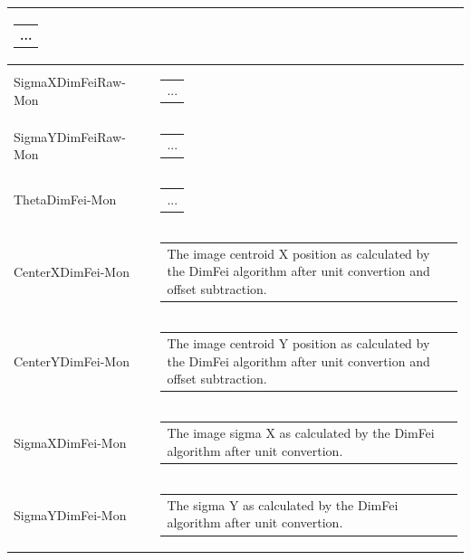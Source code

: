 \documentclass[openany]{article}
\begin{document}
\begin{longtable}{| m{3.0cm} m{4.5cm} m{7.0cm} |}
\begin{tabular}{@{}m{6cm}@{}}
                ...
            \end{tabular} \hypertarget{pv:sigma-x-dimfei-raw}{}\\ \hline
        SigmaXDimFeiRaw-Mon &  & \begin{tabular}{@{}m{6cm}@{}}
                ...
            \end{tabular} \hypertarget{pv:center-y-dimfei-raw}{}\\ \hline
        SigmaYDimFeiRaw-Mon &  & \begin{tabular}{@{}m{6cm}@{}}
                ...
            \end{tabular} \hypertarget{pv:theta-dimfei}{}\\ \hline
        ThetaDimFei-Mon &  & \begin{tabular}{@{}m{6cm}@{}}
                ...
            \end{tabular} \hypertarget{pv:center-x-dimfei}{}\\ \hline
        CenterXDimFei-Mon &  & \begin{tabular}{@{}m{6cm}@{}}
                The image centroid X position as calculated by the DimFei algorithm
                after unit convertion and offset subtraction.
            \end{tabular} \hypertarget{pv:center-y-dimfei}{}\\ \hline
        CenterYDimFei-Mon &  & \begin{tabular}{@{}m{6cm}@{}}
                The image centroid Y position as calculated by the DimFei algorithm
                after unit convertion and offset subtraction.
            \end{tabular} \hypertarget{pv:sigma-x-dimfei}{}\\ \hline
        SigmaXDimFei-Mon &  & \begin{tabular}{@{}m{6cm}@{}}
                The image sigma X as calculated by the DimFei algorithm after unit
                convertion.
            \end{tabular} \hypertarget{pv:sigma-y-dimfei}{}\\ \hline
        SigmaYDimFei-Mon &  & \begin{tabular}{@{}m{6cm}@{}}
               The sigma Y as calculated by the DimFei algorithm after unit convertion.
            \end{tabular} \hypertarget{}{}\\ \hline

\end{longtable}
\end{document}
